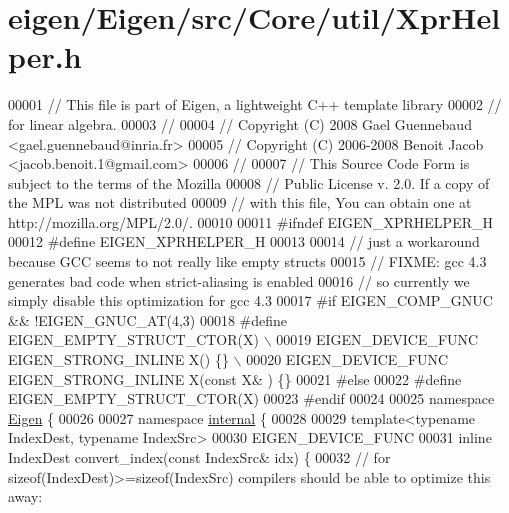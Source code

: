\hypertarget{eigen_2_eigen_2src_2_core_2util_2_xpr_helper_8h_source}{}\section{eigen/\+Eigen/src/\+Core/util/\+Xpr\+Helper.h}
\label{eigen_2_eigen_2src_2_core_2util_2_xpr_helper_8h_source}

\begin{DoxyCode}
00001 \textcolor{comment}{// This file is part of Eigen, a lightweight C++ template library}
00002 \textcolor{comment}{// for linear algebra.}
00003 \textcolor{comment}{//}
00004 \textcolor{comment}{// Copyright (C) 2008 Gael Guennebaud <gael.guennebaud@inria.fr>}
00005 \textcolor{comment}{// Copyright (C) 2006-2008 Benoit Jacob <jacob.benoit.1@gmail.com>}
00006 \textcolor{comment}{//}
00007 \textcolor{comment}{// This Source Code Form is subject to the terms of the Mozilla}
00008 \textcolor{comment}{// Public License v. 2.0. If a copy of the MPL was not distributed}
00009 \textcolor{comment}{// with this file, You can obtain one at http://mozilla.org/MPL/2.0/.}
00010 
00011 \textcolor{preprocessor}{#ifndef EIGEN\_XPRHELPER\_H}
00012 \textcolor{preprocessor}{#define EIGEN\_XPRHELPER\_H}
00013 
00014 \textcolor{comment}{// just a workaround because GCC seems to not really like empty structs}
00015 \textcolor{comment}{// FIXME: gcc 4.3 generates bad code when strict-aliasing is enabled}
00016 \textcolor{comment}{// so currently we simply disable this optimization for gcc 4.3}
00017 \textcolor{preprocessor}{#if EIGEN\_COMP\_GNUC && !EIGEN\_GNUC\_AT(4,3)}
00018 \textcolor{preprocessor}{  #define EIGEN\_EMPTY\_STRUCT\_CTOR(X) \(\backslash\)}
00019 \textcolor{preprocessor}{    EIGEN\_DEVICE\_FUNC EIGEN\_STRONG\_INLINE X() \{\} \(\backslash\)}
00020 \textcolor{preprocessor}{    EIGEN\_DEVICE\_FUNC EIGEN\_STRONG\_INLINE X(const X& ) \{\}}
00021 \textcolor{preprocessor}{#else}
00022 \textcolor{preprocessor}{  #define EIGEN\_EMPTY\_STRUCT\_CTOR(X)}
00023 \textcolor{preprocessor}{#endif}
00024 
00025 \textcolor{keyword}{namespace }\hyperlink{namespace_eigen}{Eigen} \{
00026 
00027 \textcolor{keyword}{namespace }\hyperlink{namespaceinternal}{internal} \{
00028 
00029 \textcolor{keyword}{template}<\textcolor{keyword}{typename} IndexDest, \textcolor{keyword}{typename} IndexSrc>
00030 EIGEN\_DEVICE\_FUNC
00031 \textcolor{keyword}{inline} IndexDest convert\_index(\textcolor{keyword}{const} IndexSrc& idx) \{
00032   \textcolor{comment}{// for sizeof(IndexDest)>=sizeof(IndexSrc) compilers should be able to optimize this away:}

\end{DoxyCode}
